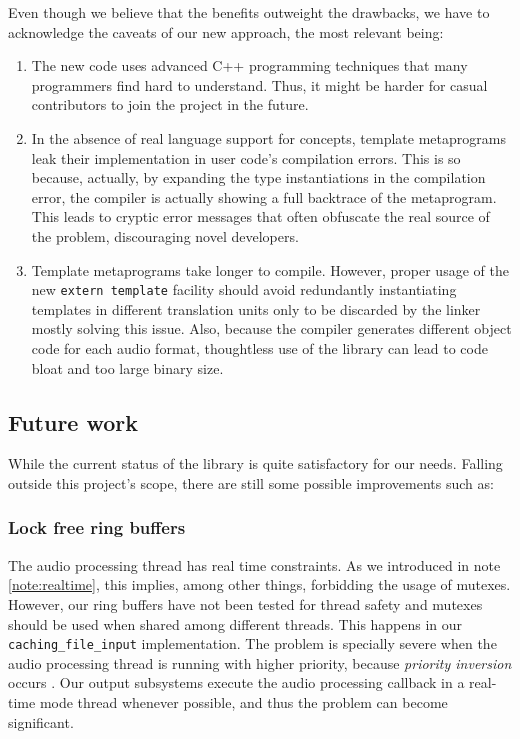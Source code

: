 Even though we believe that the benefits outweight the drawbacks, we
have to acknowledge the caveats of our new approach, the most relevant
being:
\begin{enumerate}
\item The new code uses advanced C++ programming techniques that many
  programmers find hard to understand. Thus, it might be harder for
  casual contributors to join the project in the future.

\item In the absence of real language support for concepts, template
  metaprograms leak their implementation in user code's compilation
  errors. This is so because, actually, by expanding the type
  instantiations in the compilation error, the compiler is actually
  showing a full backtrace of the metaprogram. This leads to cryptic
  error messages that often obfuscate the real source of the problem,
  discouraging novel developers.

\item Template metaprograms take longer to compile. However, proper
  usage of the new \texttt{extern template} facility should avoid
  redundantly instantiating templates in different translation units
  only to be discarded by the linker mostly solving this issue. Also,
  because the compiler generates different object code for each audio
  format, thoughtless use of the library can lead to code bloat and
  too large binary size.
\end{enumerate}

\subsection{Future work}

While the current status of the library is quite satisfactory for our
needs. Falling outside this project's scope, there are still some
possible improvements such as:

\subsubsection{Lock free ring buffers}
\label{sec:fixringbuffer}

The audio processing thread has real time
constraints. As we introduced in note \ref{note:realtime}, this
implies, among other things, forbidding the usage of mutexes. However,
our ring buffers have not been tested for thread safety and mutexes
should be used when shared among different threads. This happens in
our \texttt{caching\_file\_input} implementation. The problem is
specially severe when the audio processing thread is running with
higher priority, because \emph{priority
  inversion} occurs \cite{kim03basic}. Our output subsystems execute
the audio processing callback in a real-time mode thread whenever
possible, and thus the problem can become significant.

